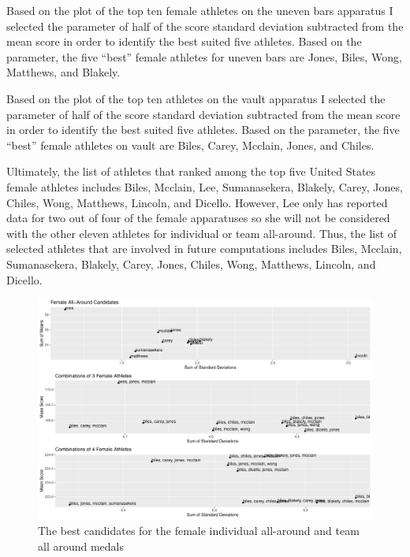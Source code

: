 \documentclass[12pt]{article}
\begin{document}
Based on the plot of the top ten female athletes on the uneven bars apparatus I selected the parameter of 
half of the score standard deviation subtracted from the mean score in order to identify the best suited five 
athletes. Based on the parameter, the five ``best'' female athletes for uneven bars are Jones, Biles, Wong, 
Matthews, and Blakely.



Based on the plot of the top ten athletes on the vault apparatus I selected the parameter of 
half of the score standard deviation subtracted from the mean score in order to identify the best suited five 
athletes. Based on the parameter, the five ``best'' female athletes on vault are Biles, Carey, Mcclain, Jones, 
and Chiles.

Ultimately, the list of athletes that ranked among the top five United States female athletes includes Biles, 
Mcclain, Lee, Sumanasekera, Blakely, Carey, Jones, Chiles, Wong, Matthews, Lincoln, and Dicello. However, Lee 
only has reported data for two out of four of the female apparatuses so she will not be considered with the other 
eleven athletes for individual or team all-around. Thus, the list of selected athletes that are involved in future 
computations includes Biles, Mcclain, Sumanasekera, Blakely, Carey, Jones, Chiles, Wong, Matthews, Lincoln, 
and Dicello.

\begin{figure}
  \centering
  \includegraphics[scale=0.55]{FemaleMultipleAllAround.pdf}
  \caption{The best candidates for the female individual all-around and team all around medals}
  \label{fig:FAA}
\end{figure}
\end{document}
